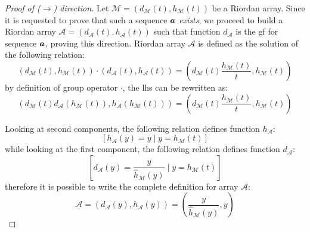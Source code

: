 \begin{proof}[Proof of ($\rightarrow$) direction]
    Let $\mathcal{M}=(d_{\mathcal{M}}(t),h_{\mathcal{M}}(t))$ be a Riordan array. Since it is requested
    to prove that such a sequence $\boldsymbol{a}$ \emph{exists}, we proceed to
    build a Riordan array $\mathcal{A}=(d_{\mathcal{A}}(t),h_{\mathcal{A}}(t))$ such
    that function $d_{\mathcal{A}}$ is the \ac{gf} for sequence $\boldsymbol{a}$, proving this direction.
    Riordan array $\mathcal{A}$ is defined as the solution of the following relation:
    \begin{displaymath}
        (d_{\mathcal{M}}(t),h_{\mathcal{M}}(t))\cdot(d_{\mathcal{A}}(t),h_{\mathcal{A}}(t))
            = \left(d_{\mathcal{M}}(t)\frac{h_{\mathcal{M}}(t)}{t},h_{\mathcal{M}}(t)\right)
    \end{displaymath}
    by definition of group operator $\cdot$, the \ac{lhs} can be rewritten as:
    \begin{displaymath}
        (d_{\mathcal{M}}(t)d_{\mathcal{A}}(h_{\mathcal{M}}(t)),h_{\mathcal{A}}(h_{\mathcal{M}}(t)))
            = \left(d_{\mathcal{M}}(t)\frac{h_{\mathcal{M}}(t)}{t},h_{\mathcal{M}}(t)\right)
    \end{displaymath}
    
    Looking at second components, the following relation defines function $h_{\mathcal{A}}$:
    \begin{displaymath}
         \left[h_{\mathcal{A}}(y)=y \mid y = h_{\mathcal{M}}(t)\right]
    \end{displaymath}
    while looking at the first component, the following relation defines function $d_{\mathcal{A}}$:
    \begin{displaymath}
         \left[d_{\mathcal{A}}(y)=\frac{y}{\hat{h}_{\mathcal{M}}(y)} \mid y = h_{\mathcal{M}}(t)\right]
    \end{displaymath}
    therefore it is possible to write the complete definition for array $\mathcal{A}$:
    \begin{displaymath}
         \mathcal{A}=(d_{\mathcal{A}}(y),h_{\mathcal{A}}(y))
            =\left(\frac{y}{\hat{h}_{\mathcal{M}}(y)}, y \right)
    \end{displaymath}
    

\end{proof}
